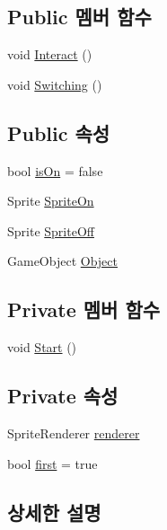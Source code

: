 \subsection*{Public 멤버 함수}
\begin{DoxyCompactItemize}
\item 
void \mbox{\hyperlink{class_switch1__1_a7a6f57395627e79c54aadef96b614673}{Interact}} ()
\item 
void \mbox{\hyperlink{class_switch1__1_ae4c8db214e6bcb25643881448180a792}{Switching}} ()
\end{DoxyCompactItemize}
\subsection*{Public 속성}
\begin{DoxyCompactItemize}
\item 
bool \mbox{\hyperlink{class_switch1__1_af6e2e065d1dda36fc6005b0952f13db9}{is\+On}} = false
\item 
Sprite \mbox{\hyperlink{class_switch1__1_a006c0e37c5191ee6a144bf2e7c80e0ad}{Sprite\+On}}
\item 
Sprite \mbox{\hyperlink{class_switch1__1_abbab824f0aa3888dfb8f369f8025bd8e}{Sprite\+Off}}
\item 
Game\+Object \mbox{\hyperlink{class_switch1__1_ace09c75d8c3db97d688cd90f57607a26}{Object}}
\end{DoxyCompactItemize}
\subsection*{Private 멤버 함수}
\begin{DoxyCompactItemize}
\item 
void \mbox{\hyperlink{class_switch1__1_acca5933d97069c48ee9b88c75856ee40}{Start}} ()
\end{DoxyCompactItemize}
\subsection*{Private 속성}
\begin{DoxyCompactItemize}
\item 
Sprite\+Renderer \mbox{\hyperlink{class_switch1__1_aea94d9e939ac4afc0a49305ab8f4db14}{renderer}}
\item 
bool \mbox{\hyperlink{class_switch1__1_a47f7069b90ac740d86285417899dd320}{first}} = true
\end{DoxyCompactItemize}


\subsection{상세한 설명}


